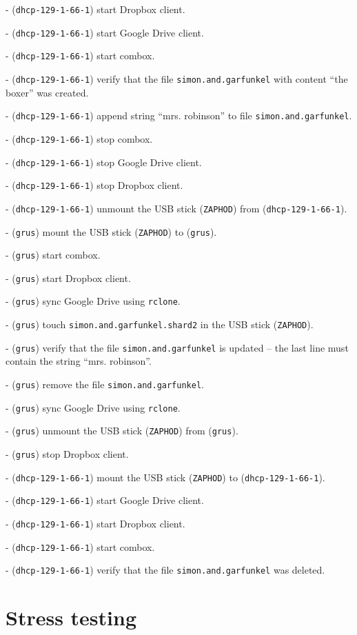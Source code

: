- (\verb+dhcp-129-1-66-1+) start Dropbox client.

- (\verb+dhcp-129-1-66-1+) start Google Drive client.

- (\verb+dhcp-129-1-66-1+) start combox.

- (\verb+dhcp-129-1-66-1+) verify that the file
\verb+simon.and.garfunkel+ with content ``the boxer'' was created.

- (\verb+dhcp-129-1-66-1+) append string ``mrs. robinson'' to file
\verb+simon.and.garfunkel+.

- (\verb+dhcp-129-1-66-1+) stop combox.

- (\verb+dhcp-129-1-66-1+) stop Google Drive client.

- (\verb+dhcp-129-1-66-1+) stop Dropbox client.

- (\verb+dhcp-129-1-66-1+) unmount the USB stick (\verb+ZAPHOD+) from
(\verb+dhcp-129-1-66-1+).

- (\verb+grus+) mount the USB stick (\verb+ZAPHOD+) to (\verb+grus+).

- (\verb+grus+) start combox.

- (\verb+grus+) start Dropbox client.

- (\verb+grus+) sync Google Drive using \verb+rclone+.

- (\verb+grus+) touch \verb+simon.and.garfunkel.shard2+ in the USB
stick (\verb+ZAPHOD+).

- (\verb+grus+) verify that the file \verb+simon.and.garfunkel+ is
updated -- the last line must contain the string ``mrs. robinson''.

- (\verb+grus+) remove the file \verb+simon.and.garfunkel+.

- (\verb+grus+) sync Google Drive using \verb+rclone+.

- (\verb+grus+) unmount the USB stick (\verb+ZAPHOD+) from
(\verb+grus+).

- (\verb+grus+) stop Dropbox client.

- (\verb+dhcp-129-1-66-1+) mount the USB stick (\verb+ZAPHOD+) to
(\verb+dhcp-129-1-66-1+).

- (\verb+dhcp-129-1-66-1+) start Google Drive client.

- (\verb+dhcp-129-1-66-1+) start Dropbox client.

- (\verb+dhcp-129-1-66-1+) start combox.

- (\verb+dhcp-129-1-66-1+) verify that the file
\verb+simon.and.garfunkel+ was deleted.


\section{Stress testing}

